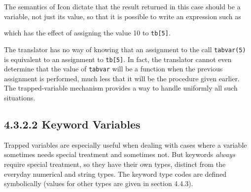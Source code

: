 
The semantics of Icon dictate that the result returned in this case
should be a variable, not just its value, so that it is possible to
write an expression such as


\noindent
which has the effect of assigning the value 10 to \texttt{tb[5]}.

The translator has no way of knowing that an assignment to the call
\texttt{tabvar(5)} is equivalent to an assignment to \texttt{tb[5]}. In
fact, the translator cannot even determine that the value of
\texttt{tabvar} will be a function when the previous assignment is
performed, much less that it will be the procedure given earlier.
The trapped-variable mechanism provides a way to handle
uniformly all such situations.

\subsection[4.3.2.2 Keyword Variables]{4.3.2.2 Keyword Variables}
Trapped variables are especially useful when dealing with cases where a
variable sometimes needs special treatment and sometimes not. But keywords
{\em always} require special treatment, so they have their own types,
distinct from the everyday numerical and string types. The keyword type
codes are defined symbolically (values for other types are given in
section 4.4.3).

\goodbreak
{}

